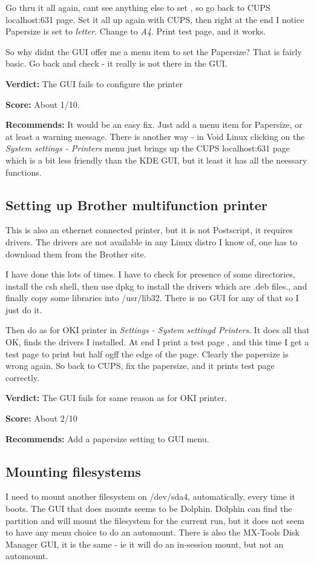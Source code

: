 \documentclass{article}  %
\begin{document}
Go thru it all again, cant see anything else to set , so go back to CUPS localhost:631 page. Set it all up again with CUPS, then right at the end I notice Papersize is set to {\em letter}. Change to {\em A4}. Print test page, and it works.

So why didnt the GUI offer me a menu item to set the Papersize? That is fairly basic.  Go back and check - it really is not there in the GUI.

{\bf Verdict:} The GUI fails to configure the printer

{\bf Score:} About 1/10. 

{\bf Recommends:} It would be an easy fix. Just add a menu item for Papersize, or at least a warning message.  There is another way - in Void Linux clicking on the {\em System settings - Printers} menu just brings up the CUPS localhost:631 page which is a bit less friendly than the KDE GUI, but it least it has all the neessary functions.

\subsection{Setting up Brother multifunction printer}
This is also an ethernet connected printer, but it is not Postscript, it requires drivers. The drivers are not available in any Linux distro I know of, one has to download them from the Brother site. 

I have done this  lots of times. I have to check for presence of some directories, install the csh shell, then use dpkg to install the drivers which are .deb files., and finally copy some libraries into /usr/lib32. There is no GUI for any of that so I just do it.

Then do as for OKI printer in {\em Settings - System settingd Printers}. It does all that OK, finds the drivers I installed. At end I print a test page , and this time I get a test page to print but half ogff the edge of the page. Clearly the papersize is wrong again. So back to CUPS, fix the papersize, and it prints test page correctly. 

{\bf Verdict:} The GUI fails for same reason as for OKI printer.

{\bf Score:} About 2/10

{\bf Recommends:} Add a papersize setting to GUI menu.


\subsection{Mounting filesystems}
I need to mount another filesystem on /dev/sda4,  automatically, every time it boots. The GUI that does mounts seems to be Dolphin. Dolphin can find the partition and will mount the filesystem for the current run, but it does not seem to have any menu choice to do an automount.  There is also the MX-Tools Disk Manager GUI, it is the same - ie it will do an in-session mount, but not an automount.
\end{document}
